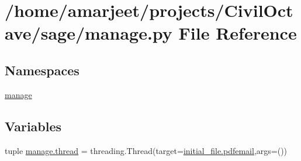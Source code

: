 \hypertarget{a00020}{}\section{/home/amarjeet/projects/\+Civil\+Octave/sage/manage.py File Reference}
\label{a00020}
\subsection*{Namespaces}
\begin{DoxyCompactItemize}
\item 
 \hyperlink{a00040}{manage}
\end{DoxyCompactItemize}
\subsection*{Variables}
\begin{DoxyCompactItemize}
\item 
tuple \hyperlink{a00040_ab0c13dd165a5c8a6f3e3c029a2acd921}{manage.\+thread} = threading.\+Thread(target=\hyperlink{a00037_a105b1aa7bf4db853b6f4d064ed224030}{initial\+\_\+file.\+pdfemail},args=())
\end{DoxyCompactItemize}
